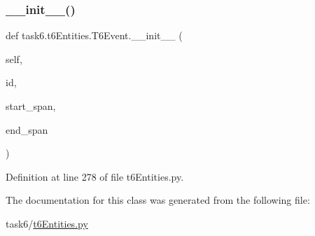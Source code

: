 \subsubsection{\texorpdfstring{\+\_\+\+\_\+init\+\_\+\+\_\+()}{\_\_init\_\_()}}
{\footnotesize\ttfamily def task6.\+t6\+Entities.\+T6\+Event.\+\_\+\+\_\+init\+\_\+\+\_\+ (\begin{DoxyParamCaption}\item[{}]{self,  }\item[{}]{id,  }\item[{}]{start\+\_\+span,  }\item[{}]{end\+\_\+span }\end{DoxyParamCaption})}



Definition at line 278 of file t6\+Entities.\+py.



The documentation for this class was generated from the following file\+:\begin{DoxyCompactItemize}
\item 
task6/\hyperlink{t6Entities_8py}{t6\+Entities.\+py}\end{DoxyCompactItemize}

